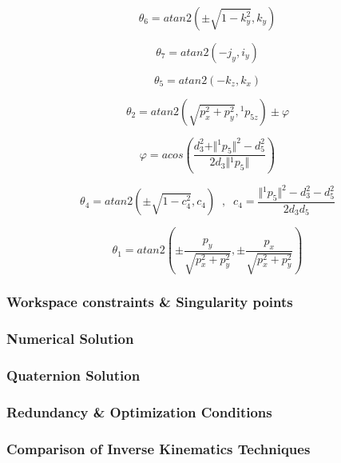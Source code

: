 \[
θ_6 = atan2 \left( \pm \sqrt{1-k_y^2}, k_y \right)
\]

\[
θ_7 = atan2 \left( -j_y, i_y \right)
\]

\[
θ_5 = atan2 \left( - k_z, k_x \right)
\]

\[
θ_2 = atan2 \left( \sqrt{p_x^2 + p_y^2}, {}^1p_{5z} \right) \pm φ
\]

\[
φ = acos \left( \frac{d_3^2 + \Vert{}^1p_{5}\Vert ^2 - d_5^2}{2d_3 \Vert{}^1p_{5}\Vert} \right)
\]

\[
θ_4 = atan2 \left( \pm \sqrt{1 - c_4^2}, c_4 \right) \;\; , \;\; c_4 = \frac{ \Vert{}^1p_{5}\Vert ^2 - d_3^2 - d_5^2 }{2d_3d_5}
\]

\[
θ_1 = atan2 \left( \pm \frac{p_y}{\sqrt{p_x^2 + p_y^2}} , \pm \frac{p_x}{\sqrt{p_x^2 + p_y^2}} \right)
\]

\subsubsection{Workspace constraints \& Singularity points}

\subsubsection{Numerical Solution}

\subsubsection{Quaternion Solution}

\subsubsection{Redundancy \& Optimization Conditions}

\subsubsection{Comparison of Inverse Kinematics Techniques}
